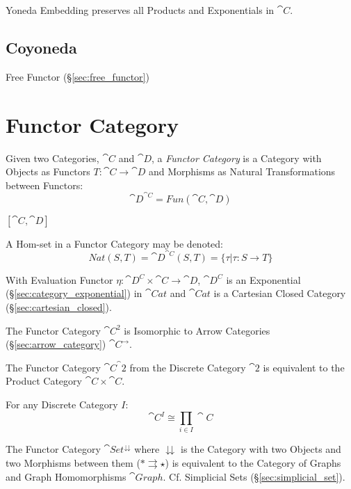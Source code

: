 Yoneda Embedding preserves all Products and Exponentials in
$\cat{C}$.



\subsection{Coyoneda}\label{sec:coyoneda}

Free Functor (\S\ref{sec:free_functor})



\section{Functor Category}\label{sec:functor_category}

Given two Categories, $\cat{C}$ and $\cat{D}$, a \emph{Functor
  Category} is a Category with Objects as Functors $T : \cat{C}
\rightarrow \cat{D}$ and Morphisms as Natural Transformations
between Functors:
\[
  \cat{D}^{\cat{C}} = Fun(\cat{C},\cat{D})
\]

$[\cat{C},\cat{D}]$

A Hom-set in a Functor Category may be denoted:
\[
  Nat(S,T) = \cat{D}^{\cat{C}}(S,T) =
    \{ \tau | \tau : S \rightarrow T \}
\]

With Evaluation Functor $\eta : \cat{D^C} \times \cat{C} \rightarrow
\cat{D}$, $\cat{D^C}$ is an Exponential
(\S\ref{sec:category_exponential}) in $\cat{Cat}$ and $\cat{Cat}$ is a
Cartesian Closed Category (\S\ref{sec:cartesian_closed}).

The Functor Category $\cat{C^2}$ is Isomorphic to Arrow Categories
(\S\ref{sec:arrow_category}) $\cat{C}^\rightarrow$.

The Functor Category $\cat{C}^\cat{2}$ from the Discrete Category
$\cat{2}$ is equivalent to the Product Category $\cat{C} \times
\cat{C}$.

For any Discrete Category $I$:
\[
  \cat{C}^I \cong \prod_{i \in I} \cat{C}
\]

The Functor Category $\cat{Set}^\downdownarrows$ where
$\downdownarrows$ is the Category with two Objects and two Morphisms
between them ($* \rightrightarrows \star$) is equivalent to the
Category of Graphs and Graph Homomorphisms $\cat{Graph}$. Cf.
Simplicial Sets (\S\ref{sec:simplicial_set}).

